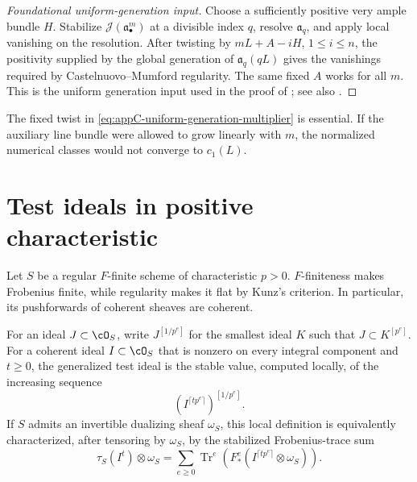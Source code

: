\begin{proof}[Foundational uniform-generation input]
Choose a sufficiently positive very ample bundle \(H\).  Stabilize
\(\mathcal J(\mathfrak a_\bullet^m)\) at a divisible index \(q\), resolve
\(\mathfrak a_q\), and apply local vanishing on the resolution.
After twisting by \(mL+A-iH\), \(1\leq i\leq n\), the positivity supplied
by the global generation of \(\mathfrak a_q(qL)\) gives the vanishings
required by Castelnuovo--Mumford regularity.  The same fixed \(A\) works
for all \(m\).  This is the uniform generation input used in the proof of
\cite[Theorem~5.20]{BJ22}; see also \cite[Chapter~11]{PAG2}.
\end{proof}

\begin{remark}[Checkpoint]
\label{rem:appC-fixed-twist}
The fixed twist in \eqref{eq:appC-uniform-generation-multiplier} is
essential.  If the auxiliary line bundle were allowed to grow linearly
with \(m\), the normalized numerical classes would not converge to
\(c_1(L)\).
\end{remark}

\section{Test ideals in positive characteristic}
\label{sec:appC-test-ideals}

Let \(S\) be a regular \(F\)-finite scheme of characteristic \(p>0\).
\(F\)-finiteness makes Frobenius finite, while regularity makes it flat by
Kunz's criterion.  In particular, its pushforwards of coherent sheaves are
coherent.

\begin{definition}
\label{def:appC-test-ideal}
For an ideal \(J\subset\cO_S\), write \(J^{[1/p^e]}\) for the smallest
ideal \(K\) such that \(J\subset K^{[p^e]}\).  For a coherent ideal
\(I\subset\cO_S\) that is nonzero on every
integral component and \(t\geq0\), the generalized test ideal is the stable
value, computed locally, of the increasing sequence
\[
 \left(I^{\lceil tp^e\rceil}\right)^{[1/p^e]}.
\]
If \(S\) admits an invertible dualizing sheaf \(\omega_S\), this local
definition is equivalently characterized, after tensoring by
\(\omega_S\), by the stabilized Frobenius-trace sum
\[
 \tau_S(I^t)\otimes\omega_S
 =
 \sum_{e\geq0}
 \operatorname{Tr}^e\left(
 F_*^e(I^{\lceil tp^e\rceil}\otimes\omega_S)
 \right).
\tag{C.20}\label{eq:appC-test-trace}
\]
\end{definition}

